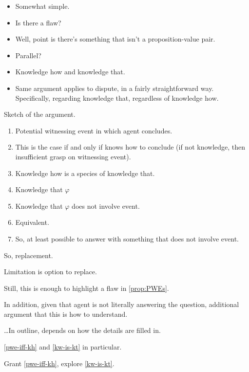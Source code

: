 \begin{note}
  \begin{itemize}
  \item
    Somewhat simple.
  \item
    Is there a flaw?
  \item
    Well, point is there's something that isn't a proposition-value pair.
  \item
    Parallel?
  \item
    Knowledge how and knowledge that.
  \item
    Same argument applies to dispute, in a fairly straightforward way.
    Specifically, regarding knowledge that, regardless of knowledge how.
  \end{itemize}
\end{note}

\begin{note}
  Sketch of the argument.

  \begin{enumerate}
  \item
    Potential witnessing event in which agent concludes.
  \item
    \label{pwe-iff-kh}
    This is the case if and only if knows how to conclude (if not knowledge, then insufficient grasp on witnessing event).
  \item
    \label{kw-is-kt}
    Knowledge how is a species of knowledge that.
  \item
    Knowledge that \(\varphi\)
  \item
    Knowledge that \(\varphi\) does not involve event.
  \item
    Equivalent.
  \item
    So, at least possible to answer with something that does not involve event.
  \end{enumerate}

  So, replacement.

  Limitation is option to replace.

  Still, this is enough to highlight a flaw in \autoref{prop:PWEs}.

  In addition, given that agent is not literally answering the question, additional argument that this is how to understand.
\end{note}

\begin{note}
  \dots In outline, depends on how the details are filled in.

  \autoref{pwe-iff-kh} and \autoref{kw-is-kt} in particular.

  Grant \autoref{pwe-iff-kh}, explore \autoref{kw-is-kt}.
\end{note}

